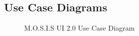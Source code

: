 \subsection{Use Case Diagrams}
\begin{figure}[ht!]
	\caption{M.O.S.I.S UI 2.0 Use Case Diagram}
\end{figure}